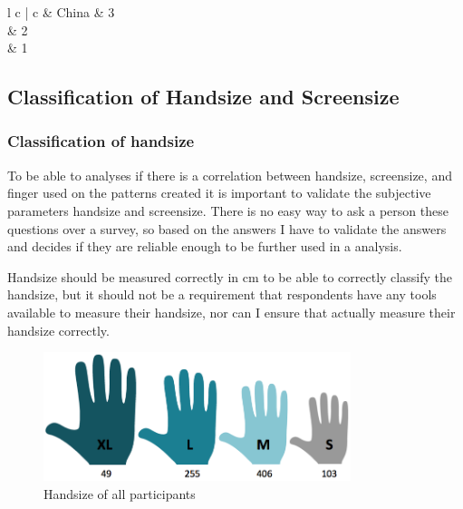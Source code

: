 {\begin{table}[H]
\begin{tabular}{ l c | c }
	       & China & 3 \\ \hline
	       & 2 \\ \hline
	       & 1 \\ \hline
	    \end{tabular}
	    \caption{Respondents country of origin}
	    \label{tab:country}
	  \end{table}

  {\renewcommand{\arraystretch}{1}%
    
  
  \clearpage
	\subsection{Classification of Handsize and Screensize} \label{sec:classificationhandsizescreensize}

    \subsubsection*{Classification of handsize}
    To be able to analyses if there is a correlation between handsize, screensize, and finger used on the patterns created it is important to validate the subjective parameters handsize and screensize. There is no easy way to ask a person these questions over a survey, so based on the answers I have to validate the answers and decides if they are reliable enough to be further used in a analysis. 

    Handsize should be measured correctly in cm to be able to correctly classify the handsize, but it should not be a requirement that respondents have any tools available to measure their handsize, nor can I ensure that actually measure their handsize correctly. 


		\begin{figure}[H]
      \centering
      \includegraphics[width=0.8\textwidth]{pics/analysis/handsize.png}
      \caption{Handsize of all participants}
      \label{fig:handsize}
    \end{figure}

}}
